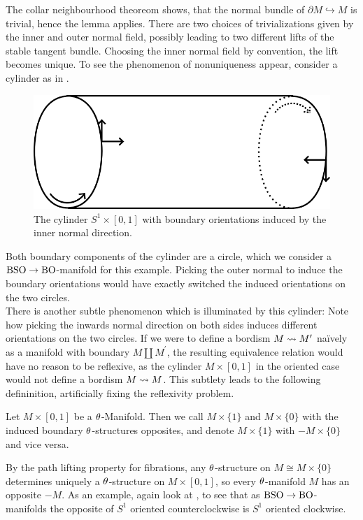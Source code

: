 The collar neighbourhood theoreom shows, that the normal bundle of $\partial M \hookrightarrow M$ is trivial, hence the lemma applies. 
There are two choices of trivializations given by the inner and outer normal field, possibly leading to two different lifts of the stable tangent bundle.
Choosing the inner normal field by convention, the lift becomes unique.
To see the phenomenon of nonuniqueness appear, consider a cylinder as in . 
\begin{figure}
    \centering
    \includegraphics[width=.6\textwidth]{img/cyl.png}
    \caption{The cylinder $S^1\times [0,1]$ with boundary orientations induced by the inner normal direction.}\label{fig:cyl}
\end{figure}
Both boundary components of the cylinder are a circle, which we consider a $\mathrm{BSO}\to\mathrm{BO}$-manifold for this example. 
Picking the outer normal to induce the boundary orientations would have exactly switched the induced orientations on the two circles.\\
There is another subtle phenomenon which is illuminated by this cylinder:
Note how picking the inwards normal direction on both sides induces different orientations on the two circles.
If we were to define a bordism $M\rightsquigarrow M^\prime$ na\"{i}vely as a manifold with boundary $M\amalg M^\prime$, the resulting equivalence relation would have no reason to be reflexive, as the cylinder $M\times [0,1]$ in the oriented case would not define a bordism $M\rightsquigarrow M$.
This subtlety leads to the following defininition, artificially fixing the reflexivity problem.
\begin{defi}
    Let $M\times[0,1]$ be a $\theta$-Manifold. Then we call $M\times\{1\}$ and $M\times\{0\}$ with the induced boundary $\theta$-structures opposites, and denote $M\times\{1\}$ with $-M\times\{0\}$ and vice versa. 
\end{defi}
By the path lifting property for fibrations, any $\theta$-structure on $M\cong M\times\{0\}$ determines uniquely a $\theta$-structure on $M\times[0,1]$, so every $\theta$-manifold $M$ has an opposite $-M$.
As an example, again look at , to see that as $\mathrm{BSO} \to \mathrm{BO}$-manifolds the opposite of $S^1$ oriented counterclockwise is $S^1$ oriented clockwise.
